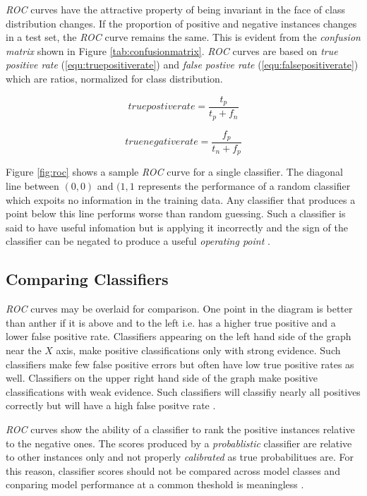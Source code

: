\documentclass[12pt]{unbthesis}
\begin{document}
\textit{ROC} curves have the attractive property of being invariant
in the face of class distribution changes. If the proportion of positive and
negative instances changes in a test set, the \textit{ROC} curve
remains the same. This is evident from the \textit{confusion matrix}
shown in Figure \ref{tab:confusionmatrix}. \textit{ROC} curves are
based on \textit{true positive rate} (\ref{equ:truepositiverate}) and
\textit{false postive rate} (\ref{equ:falsepositiverate}) which are
ratios, normalized for class distribution.

\begin{equation}
\label{equ:truepositiverate}
true postive rate = \frac{t_p}{t_p + f_n}
\end{equation}

\begin{equation}
\label{equ:falsepositiverate}
true negative rate = \frac{f_p}{t_n + f_p}
\end{equation}


Figure \ref{fig:roc} shows a sample
\textit{ROC} curve for a single classifier. The diagonal line between
\((0,0)\) and \((1,1\) represents the performance of a random
classifier which expoits no information in the training data. Any
classifier that produces a point below this line performs worse than
random guessing. Such a classifier is said to have useful infomation
but is applying it incorrectly and the sign of the classifier can be
negated to produce a useful \textit{operating point} \cite{Refworks:60}.

\subsection{Comparing Classifiers}
\textit{ROC} curves may be overlaid for comparison. One
point in the diagram is better than anther if it is above and to the left
i.e. has a higher true positive and a lower false positive
rate. Classifiers appearing on the left hand side of the graph near
the \(X\) axis, make positive
classifications only with strong evidence. Such classifiers make few
false positive errors but often have low true positive rates as
well. Classifiers on the upper right hand side of the graph make
positive classifications with weak evidence. Such classifiers will
classifiy nearly all positives correctly but will have a high false
positve rate \cite{Refworks:39}.

\textit{ROC} curves show the ability of a classifier to rank the
positive instances relative to the negative ones. The scores produced
by a \textit{probablistic} classifier are relative to other instances
only and not properly \textit{calibrated} as true probabilitues
are. For this reason, classifier scores should not be compared across
model classes and conparing model performance at a common theshold is
meaningless \cite{Refworks:39}.
\end{document}
